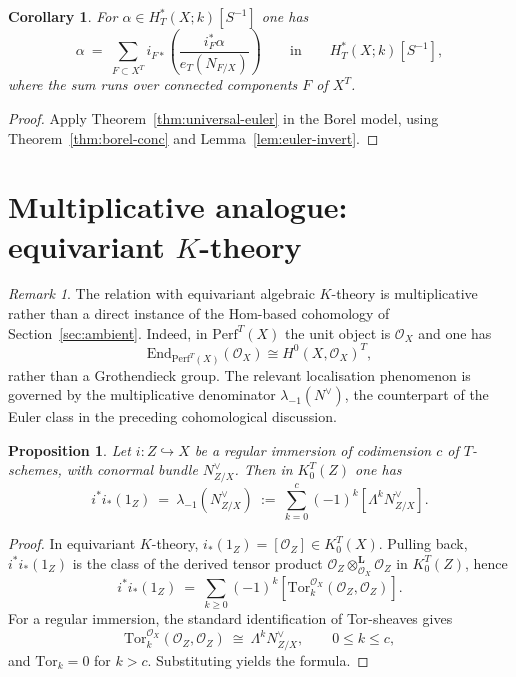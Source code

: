 \documentclass[10pt,a4paper,dvipsnames,x11names]{amsart}
\newcommand{\End}{\mathrm{End}}
\providecommand{\OO}{\mathcal O}
\providecommand{\Perf}{\mathrm{Perf}}
\numberwithin{equation}{section}
\theoremstyle{plain}
\newtheorem{proposition}[proposition]{Proposition}
\newtheorem{corollary}[corollary]{Corollary}
\theoremstyle{definition}
\theoremstyle{remark}
\newtheorem{remark}[remark]{Remark}
\begin{document}
\begin{corollary}\label{cor:abbv}
For $\alpha\in H_T^*(X;k)[S^{-1}]$ one has
$$
\alpha\ =\ \sum_{F\subset X^T} i_{F*}\!\left(\frac{i_F^*\alpha}{e_T(N_{F/X})}\right)
\qquad\text{in}\qquad
H_T^*(X;k)[S^{-1}],
$$
where the sum runs over connected components $F$ of $X^T$.
\end{corollary}

\begin{proof}
Apply Theorem~\ref{thm:universal-euler} in the Borel model, using Theorem~\ref{thm:borel-conc}
and Lemma~\ref{lem:euler-invert}.
\end{proof}


\section{Multiplicative analogue: equivariant \texorpdfstring{$K$}{K}-theory}\label{sec:K}

\begin{remark}
The relation with equivariant algebraic $K$-theory is multiplicative rather than a direct instance of the Hom-based cohomology of Section~\ref{sec:ambient}. Indeed, in $\Perf^T(X)$ the unit object is $\OO_X$ and one has
\begin{equation*}
\End_{\Perf^T(X)}(\OO_X)\cong H^0(X,\OO_X)^T,
\end{equation*}
rather than a Grothendieck group. The relevant localisation phenomenon is governed by the multiplicative denominator $\lambda_{-1}(N^\vee)$, the counterpart of the Euler class in the preceding cohomological discussion.
\end{remark}

\begin{proposition} \label{prop:K-euler}
Let $i:Z\hookrightarrow X$ be a regular immersion of codimension $c$ of $T$-schemes, with conormal bundle
$N_{Z/X}^\vee$.
Then in $K_0^T(Z)$ one has
$$
i^*i_*(1_Z)\ =\ \lambda_{-1}(N_{Z/X}^\vee)
\ :=\ \sum_{k=0}^c (-1)^k[\Lambda^k N_{Z/X}^\vee].
$$
\end{proposition}

\begin{proof}
In equivariant $K$-theory, $i_*(1_Z)=[\OO_Z]\in K_0^T(X)$.
Pulling back, $i^*i_*(1_Z)$ is the class of the derived tensor product
$\OO_Z\otimes_{\OO_X}^{\mathbf L}\OO_Z$ in $K_0^T(Z)$, hence
$$
i^*i_*(1_Z)\ =\ \sum_{k\ge 0} (-1)^k[\mathrm{Tor}_k^{\OO_X}(\OO_Z,\OO_Z)].
$$
For a regular immersion, the standard identification of Tor-sheaves gives
$$
\mathrm{Tor}_k^{\OO_X}(\OO_Z,\OO_Z)\ \cong\ \Lambda^k N_{Z/X}^\vee,
\qquad 0\le k\le c,
$$
and $\mathrm{Tor}_k=0$ for $k>c$. Substituting yields the formula.
\end{proof}
\end{document}
